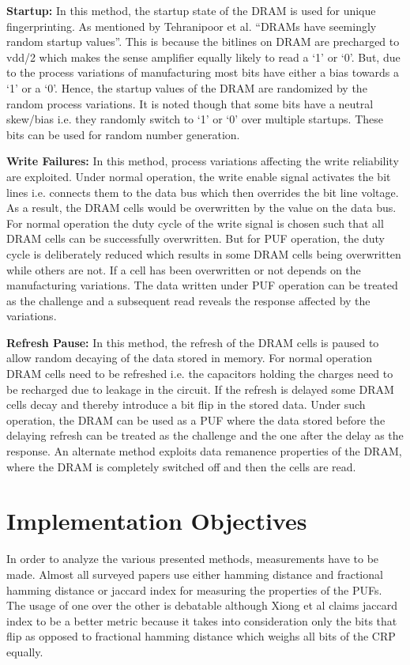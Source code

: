 \documentclass[journal, a4paper]{IEEEtran}
\begin{document}
\textbf{Startup:} In this method, the startup state of the DRAM is used for unique fingerprinting. As mentioned by Tehranipoor et al. “DRAMs have seemingly random startup values”. This is because the bitlines on DRAM are precharged to vdd/2 which makes the sense amplifier equally likely to read a ‘1’ or ‘0’. But, due to the process variations of manufacturing most bits have either a bias towards a ‘1’ or a ‘0’. Hence, the startup values of the DRAM are randomized by the random process variations. It is noted though that some bits have a neutral skew/bias i.e. they randomly switch to ‘1’ or ‘0’ over multiple startups. These bits can be used for random number generation. \cite{TEH15}

\textbf{Write Failures:} In this method, process variations affecting the write reliability are exploited. Under normal operation, the write enable signal activates the bit lines i.e. connects them to the data bus which then overrides the bit line voltage. As a result, the DRAM cells would be overwritten by the value on the data bus. For normal operation the duty cycle of the write signal is chosen such that all DRAM cells can be successfully overwritten. But for PUF operation, the duty cycle is deliberately reduced which results in some DRAM cells being overwritten while others are not. If a cell has been overwritten or not depends on the manufacturing variations. The data written under PUF operation can be treated as the challenge and a subsequent read reveals the response affected by the variations. \cite{HASH}

\textbf{Refresh Pause:} In this method, the refresh of the DRAM cells is paused to allow random decaying of the data stored in memory. \cite{SUT18} \cite{XIO16} \cite{SCH19} \cite{MISK} For normal operation DRAM cells need to be refreshed i.e. the capacitors holding the charges need to be recharged due to leakage in the circuit. If the refresh is delayed some DRAM cells decay and thereby introduce a bit flip in the stored data. Under such operation, the DRAM can be used as a PUF where the data stored before the delaying refresh can be treated as the challenge and the one after the delay as the response. An alternate method exploits data remanence properties of the DRAM, where the DRAM is completely switched off and then the cells are read. \cite{REM}

\section{Implementation Objectives}
In order to analyze the various presented methods, measurements have to be made. Almost all surveyed papers use either hamming distance and fractional hamming distance or jaccard index for measuring the properties of the PUFs.\cite{jaccard} The usage of one over the other is debatable although Xiong et al claims jaccard index to be a better metric because it takes into consideration only the bits that flip as opposed to fractional hamming distance which weighs all bits of the CRP equally. 
\end{document}
